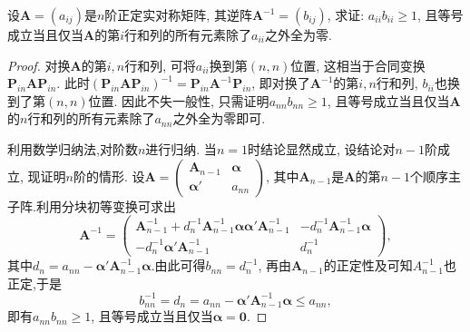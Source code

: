 \documentclass[../../main.tex]{subfiles}%
\begin{document}
\begin{example}
设$\boldsymbol{A}=(a_{ij})$是$n$阶正定实对称矩阵, 其逆阵$\boldsymbol{A}^{-1}=(b_{ij})$, 求证: $a_{ii}b_{ii}\geqslant  1$, 且等号成立当且仅当$\boldsymbol{A}$的第$i$行和列的所有元素除了$a_{ii}$之外全为零.
\end{example}
\begin{proof}

对换$\boldsymbol{A}$的第$i,n$行和列, 可将$a_{ii}$换到第$(n,n)$位置, 这相当于合同变换$\boldsymbol{P}_{in}\boldsymbol{A}\boldsymbol{P}_{in}$. 此时$(\boldsymbol{P}_{in}\boldsymbol{A}\boldsymbol{P}_{in})^{-1}=\boldsymbol{P}_{in}\boldsymbol{A}^{-1}\boldsymbol{P}_{in}$, 即对换了$\boldsymbol{A}^{-1}$的第$i,n$行和列, $b_{ii}$也换到了第$(n,n)$位置. 因此不失一般性, 只需证明$a_{nn}b_{nn}\geqslant  1$, 且等号成立当且仅当$\boldsymbol{A}$的$n$行和列的所有元素除了$a_{nn}$之外全为零即可. 

利用数学归纳法,对阶数$n$进行归纳. 当$n = 1$时结论显然成立, 设结论对$n - 1$阶成立, 现证明$n$阶的情形. 设$\boldsymbol{A}=\begin{pmatrix}
\boldsymbol{A}_{n - 1} & \boldsymbol{\alpha} \\
\boldsymbol{\alpha}' & a_{nn}
\end{pmatrix}$, 其中$\boldsymbol{A}_{n - 1}$是$\boldsymbol{A}$的第$n - 1$个顺序主子阵.利用分块初等变换可求出
\[
\boldsymbol{A}^{-1}=\begin{pmatrix}
\boldsymbol{A}_{n - 1}^{-1}+d_n^{-1}\boldsymbol{A}_{n - 1}^{-1}\boldsymbol{\alpha}\boldsymbol{\alpha}'\boldsymbol{A}_{n - 1}^{-1} & -d_n^{-1}\boldsymbol{A}_{n - 1}^{-1}\boldsymbol{\alpha} \\
-d_n^{-1}\boldsymbol{\alpha}'\boldsymbol{A}_{n - 1}^{-1} & d_n^{-1}
\end{pmatrix},
\]
其中$d_n = a_{nn}-\boldsymbol{\alpha}'\boldsymbol{A}_{n - 1}^{-1}\boldsymbol{\alpha}$.由此可得$b_{nn}=d_n^{-1}$, 再由$\boldsymbol{A}_{n - 1}$的正定性及可知$A_{n-1}^{-1}$也正定,于是
\[
b_{nn}^{-1}=d_n=a_{nn}-\boldsymbol{\alpha}'\boldsymbol{A}_{n - 1}^{-1}\boldsymbol{\alpha}\leqslant  a_{nn},
\]
即有$a_{nn}b_{nn}\geqslant  1$, 且等号成立当且仅当$\boldsymbol{\alpha}=\boldsymbol{0}$. 

\end{proof}
\end{document}
